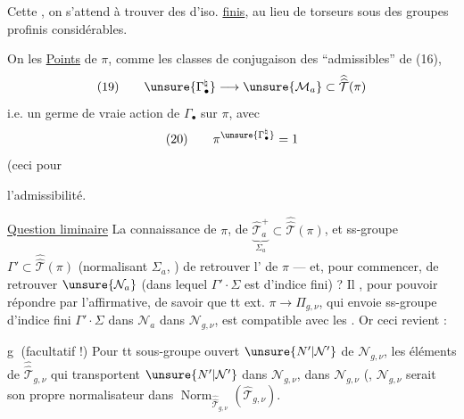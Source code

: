 Cette , on s'attend à trouver
des  d'iso. \uline{finis}, au lieu de
torseurs sous des groupes profinis
considérables.

On  les  \uline{Points} de $\pi$,
comme les classes de \inserted{$\pi$-}conjugaison
des  ``admissibles'' de (16),
\[
(19)\qquad\unsure{\Gamma_{\bullet}^{\natural}}\longrightarrow
\unsure{\mathcal M_a}\subset\widehat{\widehat{\mathcal T}}(\pi)
\]
i.e. un germe de vraie action de $\Gamma_{\bullet}$
sur $\pi$, avec
\[
(20)\qquad\pi^{\unsure{\Gamma_{\bullet}^{\natural}}}=1
\]
(ceci pour 

l'admissibilité.

\uline{Question liminaire} La connaissance de
$\pi$, de $\underbrace{\widehat{\mathcal T}_a^+}_{\Sigma_a}
\subset\widehat{\widehat{\mathcal T}}(\pi)$, et  ss-groupe
$\Gamma'\subset\widehat{\widehat{\mathcal T}}(\pi)$
(normalisant $\Sigma_a$, )
 de retrouver l' de $\pi$
--- et, pour commencer, de retrouver
$\unsure{\mathcal N_a}$ (dans lequel $\Gamma'\cdot\Sigma$ est d'indice
fini) ?  Il , pour pouvoir
répondre par l'affirmative, de savoir
que tt  ext. $\pi\longrightarrow\Pi_{g,\nu}$,
qui envoie 
 ss-groupe d'indice
fini $\Gamma'\cdot\Sigma$ dans $\mathcal N_a$ dans $\mathcal N_{g,\nu}$,
est compatible avec les .
Or ceci revient  :

\textcircled{g} (facultatif  !)
 Pour tt sous-groupe
ouvert $\unsure{N'|\mathcal N'}$ de $\mathcal N_{g,\nu}$,
les éléments de $\widehat{\widehat{\mathcal T}}_{g,\nu}$
qui transportent
$\unsure{N'|\mathcal N'}$ dans $\mathcal N_{g,\nu}$,  dans $\mathcal N_{g,\nu}$
(,
$\mathcal N_{g,\nu}$ serait son propre normalisateur
dans $\operatorname{Norm}_{\widehat{\widehat{\mathcal T}}_{g,\nu}}
(\widehat{\mathcal T}_{g,\nu})$.

